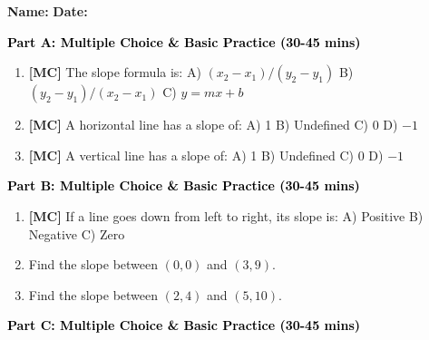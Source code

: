 \documentclass[12pt, letterpaper, fleqn]{article}
\newcommand{\blank}{\underline{\hspace{2.2cm}}}
\begin{document}
\textbf{Name:} \underline{\hspace{5cm}}
\hfill
\textbf{Date:} \underline{\hspace{3cm}}\\


\begin{tcolorbox}[colback=customteal!20]
\large\textcolor{black}{\textbf{Part A: Multiple Choice \& Basic Practice (30-45 mins)}}
\end{tcolorbox}

\vspace{3mm}

\begin{enumerate}[itemsep=2.5cm, leftmargin=0.6cm]
\item \textbf{[MC]} The slope formula is:
A) $(x_2-x_1)/(y_2-y_1)$ \quad B) $(y_2-y_1)/(x_2-x_1)$ \quad C) $y = mx+b$
\item \textbf{[MC]} A horizontal line has a slope of:
A) 1 \quad B) Undefined \quad C) 0 \quad D) $-1$
\item \textbf{[MC]} A vertical line has a slope of:
A) 1 \quad B) Undefined \quad C) 0 \quad D) $-1$
\end{enumerate}

\newpage

\begin{tcolorbox}[colback=customteal!20]
\large\textcolor{black}{\textbf{Part B: Multiple Choice \& Basic Practice (30-45 mins)}}
\end{tcolorbox}

\vspace{3mm}

\begin{enumerate}[itemsep=2.5cm, leftmargin=0.6cm, resume]
\item \textbf{[MC]} If a line goes down from left to right, its slope is:
A) Positive \quad B) Negative \quad C) Zero
\item Find the slope between $(0, 0)$ and $(3, 9)$. \blank
\item Find the slope between $(2, 4)$ and $(5, 10)$. \blank
\end{enumerate}

\newpage

\begin{tcolorbox}[colback=customteal!20]
\large\textcolor{black}{\textbf{Part C: Multiple Choice \& Basic Practice (30-45 mins)}}
\end{tcolorbox}

\vspace{3mm}
\end{document}
